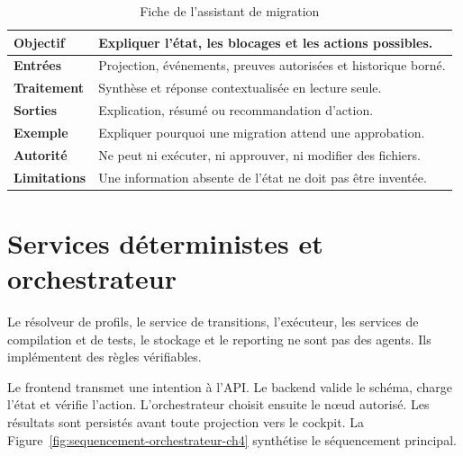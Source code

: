 \begin{table}[H]
    \centering
    \caption{Fiche de l'assistant de migration}
    \label{tab:agent-assistant-ch4}
    \small
    \begin{tabularx}{\textwidth}{|>{\bfseries\RaggedRight\arraybackslash}p{3.1cm}|>{\RaggedRight\arraybackslash}X|}
        \hline
        Objectif & Expliquer l'état, les blocages et les actions possibles. \\
        \hline
        Entrées & Projection, événements, preuves autorisées et historique borné. \\
        \hline
        Traitement & Synthèse et réponse contextualisée en lecture seule. \\
        \hline
        Sorties & Explication, résumé ou recommandation d'action. \\
        \hline
        Exemple & Expliquer pourquoi une migration attend une approbation. \\
        \hline
        Autorité & Ne peut ni exécuter, ni approuver, ni modifier des fichiers. \\
        \hline
        Limitations & Une information absente de l'état ne doit pas être inventée. \\
        \hline
    \end{tabularx}
\end{table}

\section{Services déterministes et orchestrateur}

Le résolveur de profils, le service de transitions, l'exécuteur, les services de compilation et de tests, le stockage et le reporting ne sont pas des agents. Ils implémentent des règles vérifiables.

Le frontend transmet une intention à l'API. Le backend valide le schéma, charge l'état et vérifie l'action. L'orchestrateur choisit ensuite le nœud autorisé. Les résultats sont persistés avant toute projection vers le cockpit. La Figure~\ref{fig:sequencement-orchestrateur-ch4} synthétise le séquencement principal.

